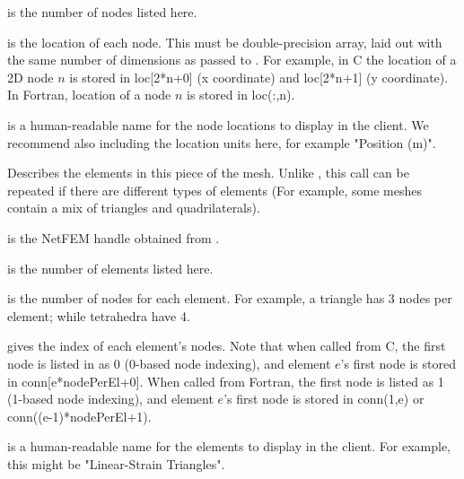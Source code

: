 \documentclass[10pt]{article}
\begin{document}
 is the number of nodes listed here.

 is the location of each node.  This must be double-precision
array, laid out with the same number of dimensions as passed to 
.  For example, in C the location of a 2D
node $n$ is stored in loc[2*n+0] (x coordinate) and loc[2*n+1]
(y coordinate).  In Fortran, location of a node $n$ is stored 
in loc(:,n).

 is a human-readable name for the node locations
to display in the client.  We recommend also including the location
units here, for example "Position (m)".



Describes the elements in this piece of the mesh.
Unlike , this call can be repeated
if there are different types of elements (For example, 
some meshes contain a mix of triangles and quadrilaterals).

 is the NetFEM handle obtained from .

 is the number of elements listed here.

 is the number of nodes for each element.
For example, a triangle has 3 nodes per element; while 
tetrahedra have 4.

 gives the index of each element's nodes.  Note
that when called from C, the first node is listed in 
 as 0 (0-based node indexing), and element $e$'s
first node is stored in conn[e*nodePerEl+0].
When called from Fortran, the first node is listed as 1 
(1-based node indexing), and element $e$'s first node is
stored in conn(1,e) or conn((e-1)*nodePerEl+1).

 is a human-readable name for the elements
to display in the client.  For example, this might be
"Linear-Strain Triangles".



\end{document}
